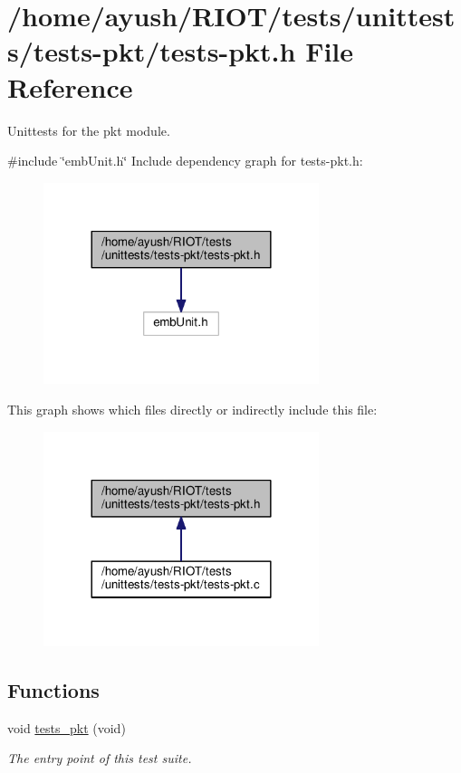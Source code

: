 \hypertarget{tests-pkt_8h}{}\section{/home/ayush/\+R\+I\+O\+T/tests/unittests/tests-\/pkt/tests-\/pkt.h File Reference}
\label{tests-pkt_8h}


Unittests for the {\ttfamily pkt} module.  


{\ttfamily \#include \char`\"{}emb\+Unit.\+h\char`\"{}}\newline
Include dependency graph for tests-\/pkt.h\+:
\nopagebreak
\begin{figure}[H]
\begin{center}
\leavevmode
\includegraphics[width=228pt]{tests-pkt_8h__incl}
\end{center}
\end{figure}
This graph shows which files directly or indirectly include this file\+:
\nopagebreak
\begin{figure}[H]
\begin{center}
\leavevmode
\includegraphics[width=228pt]{tests-pkt_8h__dep__incl}
\end{center}
\end{figure}
\subsection*{Functions}
\begin{DoxyCompactItemize}
\item 
void \hyperlink{group__unittests_gac6498b5301bbbb078c592d170ae7337d}{tests\+\_\+pkt} (void)
\begin{DoxyCompactList}\small\item\em The entry point of this test suite. \end{DoxyCompactList}\end{DoxyCompactItemize}


